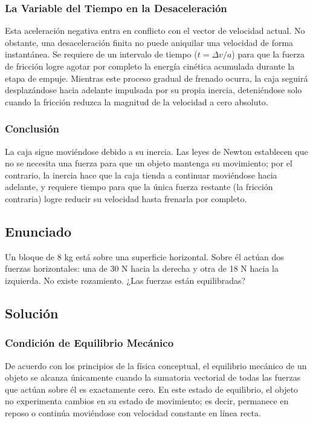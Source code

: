 \documentclass[12pt]{article}
\begin{document}
\subsubsection*{La Variable del Tiempo en la Desaceleración}
Esta aceleración negativa entra en conflicto con el vector de velocidad actual. No obstante, una desaceleración finita no puede aniquilar una velocidad de forma instantánea. Se requiere de un intervalo de tiempo ($t = \Delta v / a$) para que la fuerza de fricción logre agotar por completo la energía cinética acumulada durante la etapa de empuje. Mientras este proceso gradual de frenado ocurra, la caja seguirá desplazándose hacia adelante impulsada por su propia inercia, deteniéndose solo cuando la fricción reduzca la magnitud de la velocidad a cero absoluto.

\subsubsection*{Conclusión}
La caja sigue moviéndose debido a su inercia. Las leyes de Newton establecen que no se necesita una fuerza para que un objeto mantenga su movimiento; por el contrario, la inercia hace que la caja tienda a continuar moviéndose hacia adelante, y requiere tiempo para que la única fuerza restante (la fricción contraria) logre reducir su velocidad hasta frenarla por completo.

\newpage

\subsection*{Enunciado}
Un bloque de 8 kg está sobre una superficie horizontal. Sobre él actúan dos fuerzas horizontales: una de 30 N hacia la derecha y otra de 18 N hacia la izquierda. No existe rozamiento. ¿Las fuerzas están equilibradas?

\subsection*{Solución}

\subsubsection*{Condición de Equilibrio Mecánico}
De acuerdo con los principios de la física conceptual, el equilibrio mecánico de un objeto se alcanza únicamente cuando la sumatoria vectorial de todas las fuerzas que actúan sobre él es exactamente cero. En este estado de equilibrio, el objeto no experimenta cambios en su estado de movimiento; es decir, permanece en reposo o continúa moviéndose con velocidad constante en línea recta.
\end{document}
